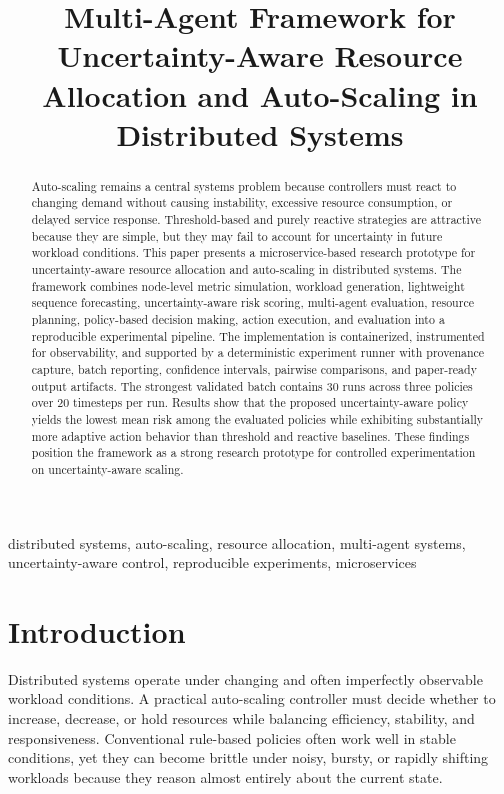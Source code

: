\documentclass[conference]{IEEEtran}
\title{Multi-Agent Framework for Uncertainty-Aware Resource Allocation and Auto-Scaling in Distributed Systems}
\author{
\IEEEauthorblockN{Your Name}
\IEEEauthorblockA{
Department / Institution\\
City, Country\\
email@example.com}
\and
\IEEEauthorblockN{Co-Author Name}
\IEEEauthorblockA{
Department / Institution\\
City, Country\\
email@example.com}
}
\begin{document}
\maketitle

\begin{abstract}
Auto-scaling remains a central systems problem because controllers must react to changing demand without causing instability, excessive resource consumption, or delayed service response. Threshold-based and purely reactive strategies are attractive because they are simple, but they may fail to account for uncertainty in future workload conditions. This paper presents a microservice-based research prototype for uncertainty-aware resource allocation and auto-scaling in distributed systems. The framework combines node-level metric simulation, workload generation, lightweight sequence forecasting, uncertainty-aware risk scoring, multi-agent evaluation, resource planning, policy-based decision making, action execution, and evaluation into a reproducible experimental pipeline. The implementation is containerized, instrumented for observability, and supported by a deterministic experiment runner with provenance capture, batch reporting, confidence intervals, pairwise comparisons, and paper-ready output artifacts. The strongest validated batch contains 30 runs across three policies over 20 timesteps per run. Results show that the proposed uncertainty-aware policy yields the lowest mean risk among the evaluated policies while exhibiting substantially more adaptive action behavior than threshold and reactive baselines. These findings position the framework as a strong research prototype for controlled experimentation on uncertainty-aware scaling.
\end{abstract}

\begin{IEEEkeywords}
distributed systems, auto-scaling, resource allocation, multi-agent systems, uncertainty-aware control, reproducible experiments, microservices
\end{IEEEkeywords}

\section{Introduction}
Distributed systems operate under changing and often imperfectly observable workload conditions. A practical auto-scaling controller must decide whether to increase, decrease, or hold resources while balancing efficiency, stability, and responsiveness. Conventional rule-based policies often work well in stable conditions, yet they can become brittle under noisy, bursty, or rapidly shifting workloads because they reason almost entirely about the current state.
\end{document}
